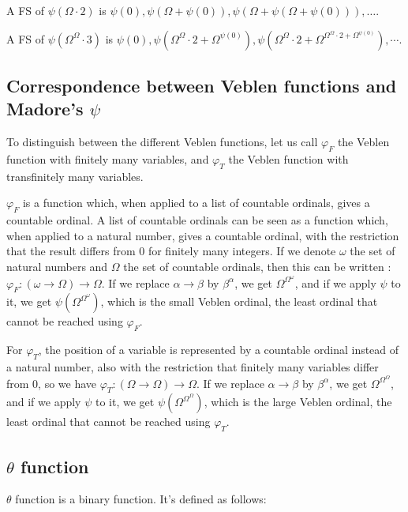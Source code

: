 \documentclass[10pt]{article}
\begin{document}
A FS of \( \psi(\Omega \cdot 2) \) is \( \psi(0), \psi(\Omega+\psi(0)), \psi(\Omega+\psi(\Omega+\psi(0))), \ldots \).

A FS of \( \psi(\Omega^\Omega \cdot 3) \) is \( \psi(0), \psi(\Omega^\Omega \cdot 2+\Omega^{\psi(0)}), \psi(\Omega^\Omega \cdot 2+\Omega^{\Omega^\Omega \cdot 2+\Omega^{\psi(0)}}), \cdots \).

\subsection{Correspondence between Veblen functions and Madore's \( \psi \)}

To distinguish between the different Veblen functions, let us call \( \varphi_F \) the Veblen function with finitely many variables, and \( \varphi_T \) the Veblen function with transfinitely many variables.

\( \varphi_F \) is a function which, when applied to a list of countable ordinals, gives a countable ordinal. A list of countable ordinals can be seen as a function which, when applied to a natural number, gives a countable ordinal, with the restriction that the result differs from 0 for finitely many integers. If we denote \( \omega \) the set of natural numbers and \( \Omega \) the set of countable ordinals, then this can be written : \( \varphi_F : (\omega \rightarrow \Omega) \rightarrow \Omega \). If we replace \( \alpha \rightarrow \beta \) by \( \beta^\alpha \), we get \( \Omega^{\Omega^\omega} \), and if we apply \( \psi \) to it, we get \( \psi(\Omega^{\Omega^\omega}) \), which is the small Veblen ordinal, the least ordinal that cannot be reached using \( \varphi_F \).

For \( \varphi_T \), the position of a variable is represented by a countable ordinal instead of a natural number, also with the restriction that finitely many variables differ from 0, so we have \( \varphi_T : (\Omega \rightarrow \Omega) \rightarrow \Omega \). If we replace \( \alpha \rightarrow \beta \) by \( \beta^\alpha \), we get \( \Omega^{\Omega^\Omega} \), and if we apply \( \psi \) to it, we get \( \psi(\Omega^{\Omega^\Omega}) \), which is the large Veblen ordinal, the least ordinal that cannot be reached using \( \varphi_T \).

\subsection{\( \theta \) function}

\( \theta  \) function is a binary function. It’s defined as follows:
\end{document}
